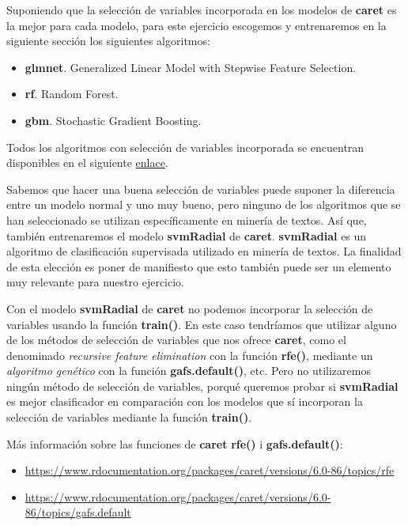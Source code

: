 \documentclass[]{article}
\begin{document}
Suponiendo que la selección de variables incorporada en los modelos de \textbf{caret} es la mejor para cada modelo, para este ejercicio escogemos y entrenaremos en la siguiente sección los siguientes algoritmos:

\begin{itemize}
	\item \textbf{glmnet}. Generalized Linear Model with Stepwise Feature Selection.
	\item \textbf{rf}. Random Forest.
	\item \textbf{gbm}. Stochastic Gradient Boosting.
\end{itemize}

Todos los algoritmos con selección de variables incorporada se encuentran disponibles en el siguiente \href{http://topepo.github.io/caret/feature-selection-overview.html}{\color{blue}enlace}.

Sabemos que hacer una buena selección de variables puede suponer la diferencia entre un modelo normal y uno muy bueno, pero ninguno de los algoritmos que se han seleccionado se utilizan específicamente en minería de textos. Así que, también entrenaremos el modelo \textbf{svmRadial} de \textbf{caret}. \textbf{svmRadial} es un algoritmo de clasificación supervisada utilizado en minería de textos. La finalidad de esta elección es poner de manifiesto que esto  también puede ser un elemento muy relevante para nuestro ejercicio.

Con el modelo \textbf{svmRadial} de \textbf{caret} no podemos incorporar la selección de variables usando la función \textbf{train()}. En este caso tendríamos que utilizar alguno de los métodos de selección de variables que nos ofrece \textbf{caret}, como el denominado \textit{recursive feature elimination} con la función \textbf{rfe()}, mediante un \textit{algoritmo genético} con la función \textbf{gafs.default()}, etc. Pero no utilizaremos ningún método de selección de variables, porqué queremos probar si \textbf{svmRadial} es mejor clasificador en comparación con los modelos que sí incorporan la selección de variables mediante la función \textbf{train()}. 

\begin{tcolorbox}
	Más información sobre las funciones de \textbf{caret} \textbf{rfe()} i \textbf{gafs.default()}:
	\begin{itemize}
		\item \url{https://www.rdocumentation.org/packages/caret/versions/6.0-86/topics/rfe} 
		\item \url{https://www.rdocumentation.org/packages/caret/versions/6.0-86/topics/gafs.default}
	\end{itemize}
\end{tcolorbox}
\end{document}
